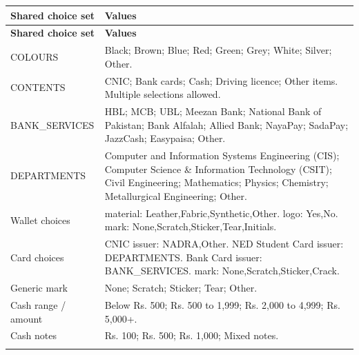 \documentclass[12pt,a4paper,oneside]{report}
\begin{document}
\begin{longtable}{@{}P{0.27\dimexpr\textwidth-12pt\relax}P{0.73\dimexpr\textwidth-12pt\relax}@{}}

\toprule \textbf{Shared choice set} & \textbf{Values} \\ \midrule\endfirsthead

\toprule \textbf{Shared choice set} & \textbf{Values} \\ \midrule\endhead

\bottomrule\endfoot

COLOURS & Black; Brown; Blue; Red; Green; Grey; White; Silver; Other. \\ \addlinespace[3pt]

CONTENTS & CNIC; Bank cards; Cash; Driving licence; Other items. Multiple selections allowed. \\ \addlinespace[3pt]

BANK\_SERVICES & HBL; MCB; UBL; Meezan Bank; National Bank of Pakistan; Bank Alfalah; Allied Bank; NayaPay; SadaPay; JazzCash; Easypaisa; Other. \\ \addlinespace[3pt]

DEPARTMENTS & Computer and Information Systems Engineering (CIS); Computer Science \& Information Technology (CSIT); Civil Engineering; Mathematics; Physics; Chemistry; Metallurgical Engineering; Other. \\ \addlinespace[3pt]

Wallet choices & material: Leather,Fabric,Synthetic,Other. logo: Yes,No. mark: None,Scratch,Sticker,Tear,Initials. \\ \addlinespace[3pt]

Card choices & CNIC issuer: NADRA,Other. NED Student Card issuer: DEPARTMENTS. Bank Card issuer: BANK\_SERVICES. mark: None,Scratch,Sticker,Crack. \\ \addlinespace[3pt]

Generic mark & None; Scratch; Sticker; Tear; Other. \\ \addlinespace[3pt]

Cash range / amount & Below Rs. 500; Rs. 500 to 1,999; Rs. 2,000 to 4,999; Rs. 5,000+. \\ \addlinespace[3pt]

Cash notes & Rs. 100; Rs. 500; Rs. 1,000; Mixed notes. \\ \addlinespace[3pt]

\end{longtable}

\end{document}
